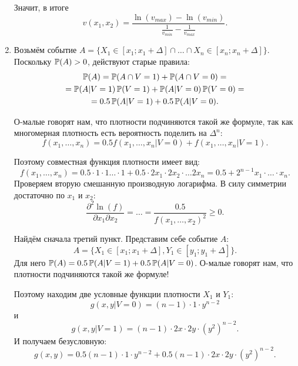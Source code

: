 \begin{enumerate}
Значит, в итоге
\begin{equation}
v(x_{1},x_{2})=\frac{\ln(v_{max})-\ln(v_{min})}{\frac{1}{v_{min}}-\frac{1}{v_{max}}}.
\end{equation}

\item Возьмём событие $ A=\{X_{1}\in[x_{1};x_{1}+\Delta] \cap \ldots \cap X_{n}\in[x_{n};x_{n}+\Delta]\} $. Поскольку $ \P(A)>0 $, действуют старые правила:
\begin{multline}
\P(A)=\P(A\cap V=1)+\P(A\cap V=0)=\\
=\P(A|V=1)\P(V=1)+\P(A|V=0)\P(V=0)=\\
=0.5\P(A|V=1)+0.5\P(A|V=0).
\end{multline}

О-малые говорят нам, что плотности подчиняются такой же формуле, так как многомерная плотность есть вероятность поделить на $ \Delta^{n} $:
\begin{equation}
f(x_{1},\ldots,x_{n})=0.5f(x_{1},\ldots,x_{n}|V=0)+f(x_{1},\ldots,x_{n}|V=1).
\end{equation}

Поэтому совместная функция плотности имеет вид:
\begin{equation}
f(x_{1},\ldots,x_{n})=0.5\cdot 1\cdot 1 \ldots\cdot 1+0.5\cdot 2x_{1}\cdot 2x_{2}\cdot \ldots 2x_{n}=0.5+2^{n-1}x_{1}\cdot \ldots \cdot x_{n}.
\end{equation}
Проверяем вторую смешанную производную логарифма. В силу симметрии достаточно по $ x_{1} $ и $ x_{2} $:
\begin{equation}
\frac{\partial^{2}\ln(f)}{\partial x_{1}\partial x_{2}}=\ldots=\frac{0.5}{f(x_{1},\ldots,x_{2})^{2}}\geq 0.
\end{equation}


Найдём сначала третий пункт. Представим себе событие $A$:
\[
A=\{X_{1}\in [x_{1};x_{1}+\Delta], Y_{1}\in[y_{1};y_{1}+\Delta]\}.
\]
Для него $ \P(A)= 0.5\P(A|V=1)+0.5\P(A|V=0)$. О-малые говорят нам, что плотности подчиняются такой же формуле!

Поэтому находим две условные функции плотности $ X_{1} $ и $ Y_{1} $:
\begin{equation}
g(x,y|V=0)=(n-1)\cdot 1 \cdot y^{n-2}
\end{equation}
и
\begin{equation}
g(x,y|V=1)=(n-1)\cdot 2x \cdot 2y \cdot (y^{2})^{n-2}.
\end{equation}
И получаем безусловную:
\begin{equation}
g(x,y)=0.5(n-1)\cdot 1 \cdot y^{n-2}+0.5(n-1)\cdot 2x \cdot 2y \cdot (y^{2})^{n-2}.
\end{equation}


\end{enumerate}
